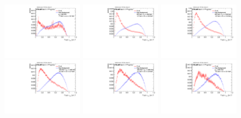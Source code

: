\begin{figure}[H]
\bigskip
\includegraphics[width=0.3\textwidth]{sascha_input/Appendix/Distributions/top/distributions/beta17/h_normal_tj_nSub32_17_bin1.pdf} \hspace{1mm}
\includegraphics[width=0.3\textwidth]{sascha_input/Appendix/Distributions/top/distributions/beta17/h_normal_tj_nSub32_17_bin2.pdf} \hspace{1mm}
\includegraphics[width=0.3\textwidth]{sascha_input/Appendix/Distributions/top/distributions/beta17/h_normal_tj_nSub32_17_bin3.pdf} 
\bigskip
\includegraphics[width=0.3\textwidth]{sascha_input/Appendix/Distributions/top/distributions/beta17/h_normal_tj_nSub32_17_bin4.pdf} \hspace{1mm}
\includegraphics[width=0.3\textwidth]{sascha_input/Appendix/Distributions/top/distributions/beta17/h_normal_tj_nSub32_17_bin5.pdf} \hspace{1mm}
\includegraphics[width=0.3\textwidth]{sascha_input/Appendix/Distributions/top/distributions/beta17/h_normal_tj_nSub32_17_bin6.pdf} 

\end{figure}
